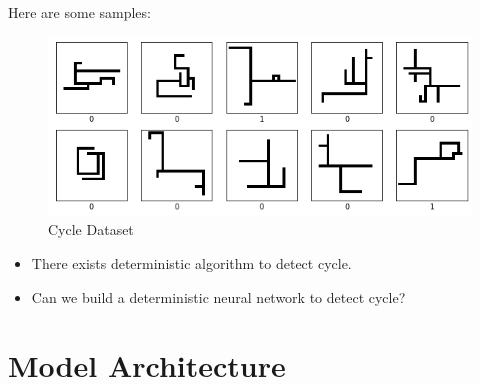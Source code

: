 \documentclass[serif]{beamer}
\begin{document}
\begin{frame}{}

	Here are some samples:

	\begin{figure}[H] %
		\centering %
		\includegraphics[width=1.0\textwidth]{../image/img10.png} %
		\caption{Cycle Dataset} %
		\label{Fig.Flow} %
	\end{figure}

\end{frame}

\begin{frame}

	\begin{itemize}

		\item There exists deterministic algorithm to detect cycle.

		\item Can we build a deterministic neural network to detect cycle?

	\end{itemize}

\end{frame}

\section{Model Architecture}
\end{document}
